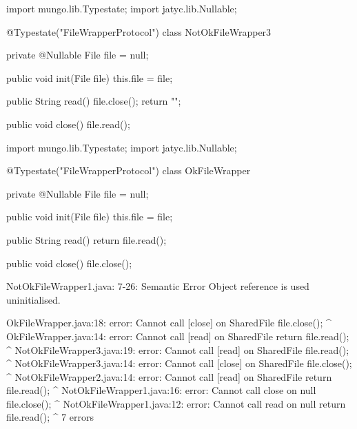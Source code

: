 \begin{code}
import mungo.lib.Typestate;
import jatyc.lib.Nullable;

@Typestate("FileWrapperProtocol")
class NotOkFileWrapper3 {

  private @Nullable File file = null;

  public void init(File file) {
    this.file = file;
  }

  public String read() {
    file.close();
    return "";
  }

  public void close() {
    file.read();
  }

}\end{code}

\begin{code}
import mungo.lib.Typestate;
import jatyc.lib.Nullable;

@Typestate("FileWrapperProtocol")
class OkFileWrapper {

  private @Nullable File file = null;

  public void init(File file) {
    this.file = file;
  }

  public String read() {
    return file.read();
  }

  public void close() {
    file.close();
  }

}\end{code}

\lstset{language=,caption=Mungo's output}
\begin{code}

NotOkFileWrapper1.java: 7-26: Semantic Error
		Object reference is used uninitialised.
\end{code}

\lstset{language=,caption=Our tool's output}
\begin{code}
OkFileWrapper.java:18: error: Cannot call [close] on Shared{File}
    file.close();
    ^
OkFileWrapper.java:14: error: Cannot call [read] on Shared{File}
    return file.read();
           ^
NotOkFileWrapper3.java:19: error: Cannot call [read] on Shared{File}
    file.read();
    ^
NotOkFileWrapper3.java:14: error: Cannot call [close] on Shared{File}
    file.close();
    ^
NotOkFileWrapper2.java:14: error: Cannot call [read] on Shared{File}
    return file.read();
           ^
NotOkFileWrapper1.java:16: error: Cannot call close on null
    file.close();
        ^
NotOkFileWrapper1.java:12: error: Cannot call read on null
    return file.read();
               ^
7 errors
\end{code}

